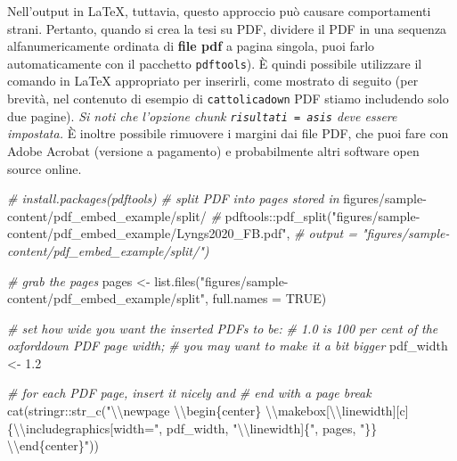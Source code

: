 \documentclass[a4paper, 11pt, nobind]{templates/ociamthesis}
\newenvironment{Shaded}{\begin{snugshade}}{\end{snugshade}}
\newcommand{\AttributeTok}[1]{\textcolor[rgb]{0.77,0.63,0.00}{#1}}
\newcommand{\CommentTok}[1]{\textcolor[rgb]{0.56,0.35,0.01}{\textit{#1}}}
\newcommand{\ConstantTok}[1]{\textcolor[rgb]{0.00,0.00,0.00}{#1}}
\newcommand{\FloatTok}[1]{\textcolor[rgb]{0.00,0.00,0.81}{#1}}
\newcommand{\FunctionTok}[1]{\textcolor[rgb]{0.00,0.00,0.00}{#1}}
\newcommand{\NormalTok}[1]{#1}
\newcommand{\OtherTok}[1]{\textcolor[rgb]{0.56,0.35,0.01}{#1}}
\newcommand{\SpecialCharTok}[1]{\textcolor[rgb]{0.00,0.00,0.00}{#1}}
\newcommand{\StringTok}[1]{\textcolor[rgb]{0.31,0.60,0.02}{#1}}
\renewenvironment{Shaded}
{
  \vspace{10pt}%
  \begin{snugshade}%
}{%
  \end{snugshade}%
  \vspace{8pt}%
}
\begin{document}
Nell'output in LaTeX, tuttavia, questo approccio può causare comportamenti strani.
Pertanto, quando si crea la tesi su PDF, dividere il PDF in una sequenza alfanumericamente ordinata di \textbf{file pdf } a pagina singola, puoi farlo automaticamente con il pacchetto \texttt{pdftools}). È quindi possibile utilizzare il comando in LaTeX appropriato per inserirli, come mostrato di seguito (per brevità, nel contenuto di esempio di \texttt{cattolicadown} PDF stiamo includendo solo due pagine).
\emph{Si noti che l'opzione chunk \texttt{risultati\ =\ \textquotesingle{}asis\textquotesingle{}} deve essere impostata.}
È inoltre possibile rimuovere i margini dai file PDF, che puoi fare con Adobe Acrobat (versione a pagamento) e probabilmente altri software open source online.

\begin{Shaded}
\begin{Highlighting}[]
\CommentTok{\# install.packages(pdftools)}
\CommentTok{\# split PDF into pages stored in}
\NormalTok{    figures}\SpecialCharTok{/}\NormalTok{sample}\SpecialCharTok{{-}}\NormalTok{content}\SpecialCharTok{/}\NormalTok{pdf\_embed\_example}\SpecialCharTok{/}\NormalTok{split}\SpecialCharTok{/}
\CommentTok{\#}
\NormalTok{    pdftools}\SpecialCharTok{::}\FunctionTok{pdf\_split}\NormalTok{(}\StringTok{"figures/sample{-}content/pdf\_embed\_example/Lyngs2020\_FB.pdf"}\NormalTok{,}
\CommentTok{\# output = "figures/sample{-}content/pdf\_embed\_example/split/")}

\CommentTok{\# grab the pages}
\NormalTok{pages }\OtherTok{\textless{}{-}} \FunctionTok{list.files}\NormalTok{(}\StringTok{"figures/sample{-}content/pdf\_embed\_example/split"}\NormalTok{,}
    \AttributeTok{full.names =} \ConstantTok{TRUE}\NormalTok{)}

\CommentTok{\# set how wide you want the inserted PDFs to be:}
\CommentTok{\# 1.0 is 100 per cent of the oxforddown PDF page width;}
\CommentTok{\# you may want to make it a bit bigger}
\NormalTok{pdf\_width }\OtherTok{\textless{}{-}} \FloatTok{1.2}

\CommentTok{\# for each PDF page, insert it nicely and}
\CommentTok{\# end with a page break}
\FunctionTok{cat}\NormalTok{(stringr}\SpecialCharTok{::}\FunctionTok{str\_c}\NormalTok{(}\StringTok{"}\SpecialCharTok{\textbackslash{}\textbackslash{}}\StringTok{newpage }\SpecialCharTok{\textbackslash{}\textbackslash{}}\StringTok{begin\{center\}}
\StringTok{    }\SpecialCharTok{\textbackslash{}\textbackslash{}}\StringTok{makebox[}\SpecialCharTok{\textbackslash{}\textbackslash{}}\StringTok{linewidth][c]\{}\SpecialCharTok{\textbackslash{}\textbackslash{}}\StringTok{includegraphics[width="}\NormalTok{, pdf\_width,}
    \StringTok{"}\SpecialCharTok{\textbackslash{}\textbackslash{}}\StringTok{linewidth]\{"}\NormalTok{, pages, }\StringTok{"\}\} }\SpecialCharTok{\textbackslash{}\textbackslash{}}\StringTok{end\{center\}"}\NormalTok{))}
\end{Highlighting}
\end{Shaded}
\end{document}
